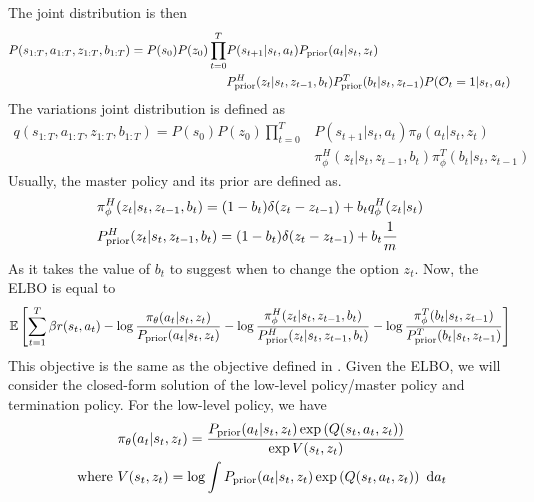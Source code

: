 The joint distribution is then 
\begin{equation}
\begin{aligned}
    P(s_{1:T}, a_{1:T}, z_{1:T}, b_{1:T}) = P(s_0)P(z_0)\prod^T_{t=0} &P(s_{t+1} | s_t, a_t) P_{\text{prior}}(a_t | s_t, z_t)\\
    &P_{\text{prior}}^H(z_t | s_t, z_{t-1}, b_t) P_{\text{prior}}^T(b_t | s_t, z_{t-1}) P(\mathcal{O}_t = 1 | s_t, a_t)
 \end{aligned}
\end{equation}
The variations joint distribution is defined as 
\begin{equation}
\begin{aligned}
    q(s_{1:T}, a_{1:T}, z_{1:T}, b_{1:T}) = P(s_0)P(z_0)\prod^T_{t=0} &P(s_{t+1} | s_t, a_t) \pi_{\theta}(a_t | s_t, z_t)\\
    &\pi^H_{\phi}(z_t | s_t, z_{t-1}, b_t) \pi^T_{\phi}(b_t | s_t, z_{t-1}) 
\end{aligned}
\end{equation}
Usually, the master policy and its prior are defined as. 
\begin{equation}
\begin{aligned}
    &\pi^H_{\phi}(z_t | s_t, z_{t-1}, b_t) = (1-b_t) \delta(z_t  - z_{t-1}) + b_t q^H_{\phi}(z_t | s_t) \\ 
    &P_{\text{prior}}^H(z_t | s_t, z_{t-1}, b_t) = (1-b_t) \delta(z_t  - z_{t-1}) + b_t \frac{1}{m}
\end{aligned}
\end{equation}
As it takes the value of $b_t$ to suggest when to change the option $z_t$. Now, the ELBO is equal to 
\begin{equation}
    \mathbb{E}\left[ \sum^T_{t=1} \beta r(s_t, a_t) - \log \frac{\pi_{\theta}(a_t | s_t, z_t)}{P_{\text{prior}}(a_t | s_t, z_t)}  - \log \frac{\pi^H_{\phi}(z_t | s_t, z_{t-1}, b_t)}{P_{\text{prior}}^H(z_t | s_t, z_{t-1}, b_t)} - \log \frac{\pi^T_{\phi}(b_t | s_t, z_{t-1}) }{P_{\text{prior}}^T(b_t | s_t, z_{t-1})} \right]
\end{equation}
This objective is the same as the objective defined in \cite{igl2019multitask}. Given the ELBO, we will consider the closed-form solution of the low-level policy/master policy and termination policy. For the low-level policy, we have 
\begin{equation}
\begin{aligned}
\label{eqn:chap4-single-HRL-lower}
    &\pi_{\theta}(a_{t} | s_{t}, z_{t}) = \frac{P_{\text{prior}}(a_{t} | s_{t}, z_{t})\exp\left( Q(s_{t}, a_{t}, z_{t}) \right)}{\exp V(s_{t}, z_{t})} \\
    \text{ where }&V(s_{t}, z_{t}) = \log \int P_{\text{prior}}(a_{t} | s_{t}, z_{t})\exp\left( Q(s_{t}, a_{t}, z_{t}) \right) \ \mathrm{d} a_{t}
\end{aligned}
\end{equation}
